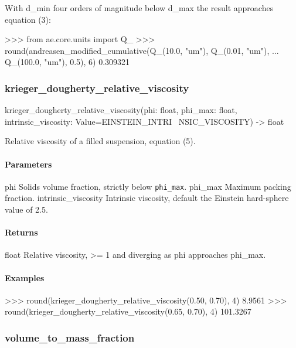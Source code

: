 \documentclass[10pt,a4paper,twoside]{report}
\begin{document}
With d\_min four orders of magnitude below d\_max the result approaches equation (3):

\begin{doctestblock}
>>> from ae.core.units import Q_
>>> round(andreasen_modified_cumulative(Q_(10.0, "um"), Q_(0.01, "um"),
...                                     Q_(100.0, "um"), 0.5), 6)
0.309321
\end{doctestblock}

\subsubsection*{krieger\_dougherty\_relative\_viscosity}

\begin{verbatimsmall}
krieger_dougherty_relative_viscosity(phi: float, phi_max: float, intrinsic_viscosity: Value=EINSTEIN_INTRI
    \ NSIC_VISCOSITY) -> float
\end{verbatimsmall}

Relative viscosity of a filled suspension, equation (5).

\paragraph*{Parameters}

phi Solids volume fraction, strictly below \texttt{phi\_max}. phi\_max Maximum packing fraction. intrinsic\_viscosity Intrinsic viscosity, default the Einstein hard-sphere value of 2.5.

\paragraph*{Returns}

float Relative viscosity, >= 1 and diverging as phi approaches phi\_max.

\paragraph*{Examples}

\begin{doctestblock}
>>> round(krieger_dougherty_relative_viscosity(0.50, 0.70), 4)
8.9561
>>> round(krieger_dougherty_relative_viscosity(0.65, 0.70), 4)
101.3267
\end{doctestblock}

\subsubsection*{volume\_to\_mass\_fraction}
\end{document}
